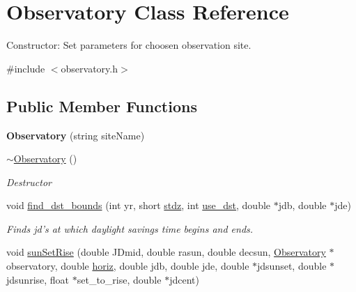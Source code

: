 \hypertarget{class_observatory}{\section{Observatory Class Reference}
\label{class_observatory}
}


Constructor\-: Set parameters for choosen observation site.  




{\ttfamily \#include $<$observatory.\-h$>$}

\subsection*{Public Member Functions}
\begin{DoxyCompactItemize}
\item 
\hypertarget{class_observatory_a9a89c8ebf04bc1720cd303cb0361f685}{{\bfseries Observatory} (string site\-Name)}\label{class_observatory_a9a89c8ebf04bc1720cd303cb0361f685}

\item 
\hypertarget{class_observatory_af88b6c93904fb5784375672b05c5bc0b}{\hyperlink{class_observatory_af88b6c93904fb5784375672b05c5bc0b}{$\sim$\-Observatory} ()}\label{class_observatory_af88b6c93904fb5784375672b05c5bc0b}

\begin{DoxyCompactList}\small\item\em Destructor \par
 \end{DoxyCompactList}\item 
void \hyperlink{class_observatory_af2e5cc35a9a68fc1c36c749ccc015719}{find\-\_\-dst\-\_\-bounds} (int yr, short \hyperlink{class_observatory_a079452085f0d8f7ae727a69973fca866}{stdz}, int \hyperlink{class_observatory_a98979301df0236da8fa1fbb857ef6ee6}{use\-\_\-dst}, double $\ast$jdb, double $\ast$jde)
\begin{DoxyCompactList}\small\item\em Finds jd's at which daylight savings time begins and ends. \end{DoxyCompactList}\item 
\hypertarget{class_observatory_a52c25c2c46d3a32f4077bd34793ba071}{void \hyperlink{class_observatory_a52c25c2c46d3a32f4077bd34793ba071}{sun\-Set\-Rise} (double J\-Dmid, double rasun, double decsun, \hyperlink{class_observatory}{Observatory} $\ast$observatory, double \hyperlink{class_observatory_a468d5da03ab3ab792354d1efc9b9c788}{horiz}, double jdb, double jde, double $\ast$jdsunset, double $\ast$jdsunrise, float $\ast$set\-\_\-to\-\_\-rise, double $\ast$jdcent)}\label{class_observatory_a52c25c2c46d3a32f4077bd34793ba071}


\end{DoxyCompactItemize}
